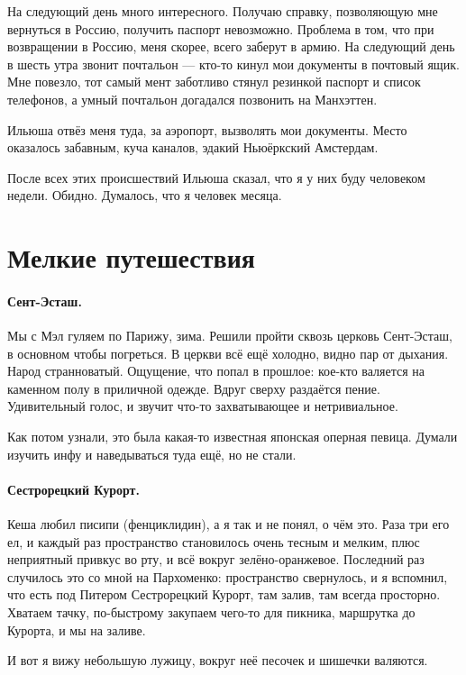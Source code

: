 \documentclass{book}
\begin{document}
На следующий день много интересного.
Получаю справку, позволяющую мне вернуться в Россию, получить паспорт невозможно.
Проблема в том, что при возвращении в Россию, меня скорее, всего заберут в армию.
На следующий день в шесть утра звонит почтальон --- кто-то кинул мои документы в почтовый ящик.
Мне повезло, тот самый мент заботливо стянул резинкой паспорт и список телефонов, а умный почтальон догадался позвонить на Манхэттен.

Ильюша отвёз меня туда, за аэропорт, вызволять мои документы.
Место оказалось забавным, куча каналов, эдакий Ньюёркский Амстердам.

После всех этих происшествий Ильюша сказал, что я у них буду человеком недели.
Обидно.
Думалось, что я человек месяца.


\section*{Мелкие путешествия}

\paragraph{Сент-Эсташ.}
Мы с Мэл гуляем по Парижу, зима.
Решили пройти сквозь церковь Сент-Эсташ, в основном чтобы погреться.
В церкви всё ещё холодно, видно пар от дыхания.
Народ странноватый. 
Ощущение, что попал в прошлое: кое-кто валяется на каменном полу в приличной одежде.
Вдруг сверху раздаётся пение.
Удивительный голос, и звучит что-то захватывающее и нетривиальное.

Как потом узнали, это была какая-то известная японская оперная певица.
Думали изучить инфу и наведываться туда ещё, но не стали.

\paragraph{Сестрорецкий Курорт.}
Кеша любил писипи (фенциклидин), а я так и не понял, о чём это.
Раза три его ел, и каждый раз пространство становилось очень тесным и мелким, плюс неприятный привкус во рту, и всё вокруг зелёно-оранжевое.
Последний раз случилось это со мной на Пархоменко: пространство свернулось, и я вспомнил, что есть под Питером Сестрорецкий Курорт, там залив, там всегда просторно.
Хватаем тачку, по-быстрому закупаем чего-то для пикника, маршрутка до Курорта, и мы на заливе.

И вот я вижу небольшую лужицу, вокруг неё песочек и шишечки валяются.
\end{document}
